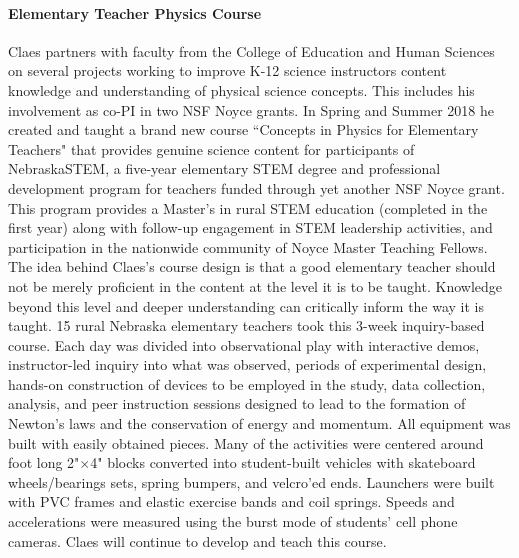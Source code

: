 \paragraph{Elementary Teacher Physics Course}
Claes partners with faculty from the College of Education and Human Sciences on several projects working to improve K-12 science instructors content knowledge and understanding of physical science concepts.  This includes his involvement as co-PI in two NSF Noyce grants. In Spring and Summer 2018 he created and taught a brand new course ``Concepts in Physics for Elementary Teachers" that provides genuine science content for participants of NebraskaSTEM, a five-year elementary STEM degree and professional development program for teachers funded through yet another NSF Noyce grant. This program provides a Master’s in rural STEM education (completed in the first year) along with follow-up engagement in STEM leadership activities, and participation in the nationwide community of Noyce Master Teaching Fellows. 
The idea behind Claes's course design is that a good elementary teacher should not be merely proficient in the content at the level it is to be taught. Knowledge beyond this level and deeper understanding can critically inform the way it is taught.
15 rural Nebraska elementary teachers took this 3-week inquiry-based course. Each day was divided into observational play with interactive demos, instructor-led inquiry into what was observed, periods of experimental design, hands-on construction of devices to be employed in the study, data collection, analysis, and peer instruction sessions designed to lead to the formation of Newton’s laws and the conservation of energy and momentum. All equipment was built with easily obtained pieces. Many of the activities were centered around foot long 2"$\times$4" blocks converted into student-built vehicles with skateboard wheels/bearings sets, spring bumpers, and velcro’ed ends. Launchers were built with PVC frames and elastic exercise bands and coil springs.  Speeds and accelerations were measured using the burst mode of students' cell phone cameras.  Claes will continue to develop and teach this course.

